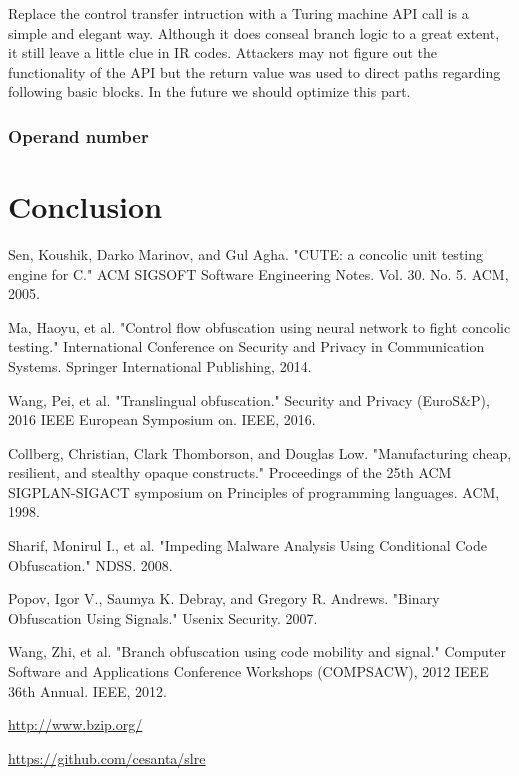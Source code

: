 \documentclass[lnicst]{svmultln}
\begin{document}
Replace the control transfer intruction with a Turing machine API call is a simple and elegant way. Although it does conseal branch logic to a great extent, it still leave a little clue in IR codes. Attackers may not figure out the functionality of the API but the return value was used to direct paths regarding following basic blocks. In the future we should optimize this part.
\subsubsection{Operand number}
\section{Conclusion}
 

%
%
\begin{thebibliography}{5}

 Sen, Koushik, Darko Marinov, and Gul Agha. "CUTE: a concolic unit testing engine for C." ACM SIGSOFT Software Engineering Notes. Vol. 30. No. 5. ACM, 2005.

 Ma, Haoyu, et al. "Control flow obfuscation using neural network to fight concolic testing." International Conference on Security and Privacy in Communication Systems. Springer International Publishing, 2014.

 Wang, Pei, et al. "Translingual obfuscation." Security and Privacy (EuroS\&P), 2016 IEEE European Symposium on. IEEE, 2016.

 Collberg, Christian, Clark Thomborson, and Douglas Low. "Manufacturing cheap, resilient, and stealthy opaque constructs." Proceedings of the 25th ACM SIGPLAN-SIGACT symposium on Principles of programming languages. ACM, 1998.

 Sharif, Monirul I., et al. "Impeding Malware Analysis Using Conditional Code Obfuscation." NDSS. 2008.

 Popov, Igor V., Saumya K. Debray, and Gregory R. Andrews. "Binary Obfuscation Using Signals." Usenix Security. 2007.

 Wang, Zhi, et al. "Branch obfuscation using code mobility and signal." Computer Software and Applications Conference Workshops (COMPSACW), 2012 IEEE 36th Annual. IEEE, 2012.

 \url{http://www.bzip.org/}

 \url{https://github.com/cesanta/slre}


\end{thebibliography}
\end{document}

